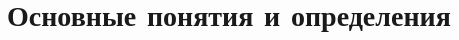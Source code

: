 \documentclass[a4paper,12pt]{article}
\begin{document}


\setcounter{page}{1}
\setcounter{tocdepth}{2}

\newcommand \ea {{1 - \alpha}}
\newcommand \al {\alpha}
\newcommand \MC {\mathrm{MC}}
\newcommand \la {{\lambda_\ast}}
\newcommand \ev {{\mathbf{v}_\ast}}

\section{Основные понятия и определения}

 

%


%


%
\end{document}
